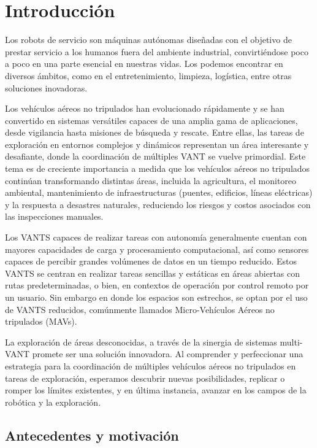 \chapter{Introducción}

Los robots de servicio son máquinas autónomas diseñadas con el objetivo de prestar servicio a los humanos fuera del ambiente industrial, convirtiéndose poco a poco en una parte esencial en nuestras vidas. Los podemos encontrar en diversos ámbitos, como en el entretenimiento, limpieza, logística, entre otras soluciones inovadoras.

Los vehículos aéreos no tripulados han evolucionado rápidamente y se han convertido en sistemas versátiles capaces de una amplia gama de aplicaciones, desde vigilancia hasta misiones de búsqueda y rescate. Entre ellas, las tareas de exploración en entornos complejos y dinámicos representan un área interesante y desafiante, donde la coordinación de múltiples VANT se vuelve primordial. Este tema es de creciente importancia a medida que los vehículos aéreos no tripulados continúan transformando distintas áreas, incluida la agricultura, el monitoreo ambiental, mantenimiento de infraestructuras (puentes, edificios, líneas eléctricas) y la respuesta a desastres naturales, reduciendo los riesgos y costos asociados con las inspecciones manuales.

Los VANTS capaces de realizar tareas con autonomía generalmente cuentan con mayores capacidades de carga y procesamiento computacional, así como sensores capaces de percibir grandes volúmenes de datos en un tiempo reducido. Estos VANTS se centran en realizar tareas sencillas y estáticas en áreas abiertas con rutas predeterminadas, o bien, en contextos de operación por control remoto por un usuario. Sin embargo en donde los espacios son estrechos, se optan por el uso de VANTS reducidos, comúnmente llamados Micro-Vehículos Aéreos no tripulados (MAVs).

La exploración de áreas desconocidas, a través de la sinergia de sistemas multi-VANT promete ser una solución innovadora. Al comprender y perfeccionar una estrategia para la coordinación de múltiples vehículos aéreos no tripulados en tareas de exploración, esperamos descubrir nuevas posibilidades, replicar o romper los límites existentes, y en última instancia, avanzar en los campos de la robótica y la exploración.

\section{Antecedentes y motivación} 

